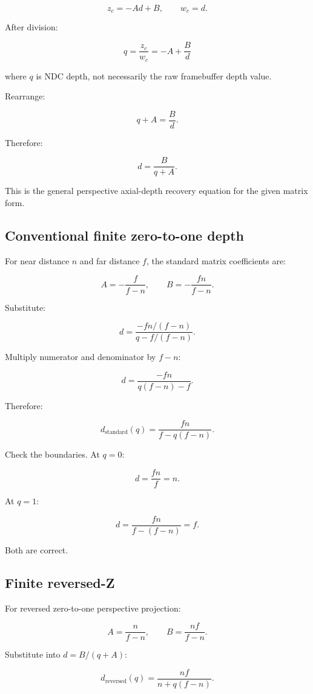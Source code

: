 \[ z_c=-Ad+B, \qquad w_c=d. \]

After division:

\[ \boxed{ q=\frac{z_c}{w_c}=-A+\frac Bd } \]

where \(q\) is NDC depth, not necessarily the raw framebuffer depth value.

Rearrange:

\[ q+A=\frac Bd. \]

Therefore:

\[ \boxed{ d=\frac B{q+A}. } \]

This is the general perspective axial-depth recovery equation for the given matrix form.

\subsection{Conventional finite zero-to-one depth}\label{02-foundations-ii-ch035-conventional-finite-zero-to-one-depth}

For near distance \(n\) and far distance \(f\), the standard matrix coefficients are:

\[ A=-\frac f{f-n}, \qquad B=-\frac{fn}{f-n}. \]

Substitute:

\[ d= \frac{-fn/(f-n)} {q-f/(f-n)}. \]

Multiply numerator and denominator by \(f-n\):

\[ d=\frac{-fn}{q(f-n)-f}. \]

Therefore:

\[ \boxed{ d_{\mathrm{standard}}(q) = \frac{fn}{f-q(f-n)}. } \]

Check the boundaries. At \(q=0\):

\[ d=\frac{fn}{f}=n. \]

At \(q=1\):

\[ d=\frac{fn}{f-(f-n)}=f. \]

Both are correct.

\subsection{Finite reversed-Z}\label{02-foundations-ii-ch035-finite-reversed-z}

For reversed zero-to-one perspective projection:

\[ A=\frac n{f-n}, \qquad B=\frac{nf}{f-n}. \]

Substitute into \(d=B/(q+A)\):

\[ \boxed{ d_{\mathrm{reversed}}(q) = \frac{nf}{n+q(f-n)}. } \]

